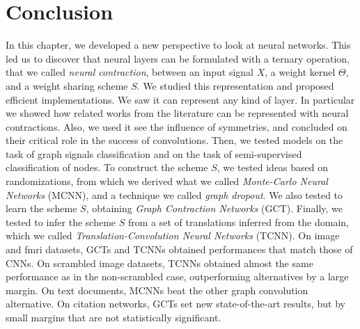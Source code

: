 \section{Conclusion}
\label{sec:3.5}

In this chapter, we developed a new perspective to look at neural networks. This led us to discover that neural layers can be formulated with a ternary operation, that we called \emph{neural contraction}, between an input signal $X$, a weight kernel $\Theta$, and a weight sharing scheme $S$. We studied this representation and proposed efficient implementations. We saw it can represent any kind of layer. In particular we showed how related works from the literature can be represented with neural contractions. Also, we used it see the influence of symmetries, and concluded on their critical role in the success of convolutions. Then, we tested models on the task of graph signals classification and on the task of semi-supervised classification of nodes. To construct the scheme $S$, we tested ideas based on randomizations, from which we derived what we called \emph{Monte-Carlo Neural Networks} (MCNN), and a technique we called \emph{graph dropout}. We also tested to learn the scheme $S$, obtaining \emph{Graph Contraction Networks} (GCT). Finally, we tested to infer the scheme $S$ from a set of translations inferred from the domain, which we called \emph{Translation-Convolution Neural Networks} (TCNN). On image and fmri datasets, GCTs and TCNNs obtained performances that match those of CNNs. On scrambled image datasets, TCNNs obtained almost the same performance as in the non-scrambled case, outperforming alternatives by a large margin. On text documents, MCNNs beat the other graph convolution alternative. On citation networks, GCTs set new state-of-the-art results, but by small margins that are not statistically significant.